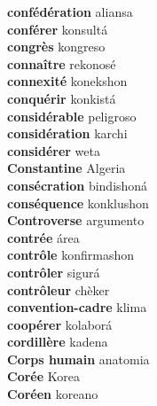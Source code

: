 \textbf{ confédération  } aliansa \\
\textbf{ conférer  } konsultá \\
\textbf{ congrès  } kongreso \\
\textbf{ connaître  } rekonosé \\
\textbf{ connexité  } konekshon \\
\textbf{ conquérir  } konkistá \\
\textbf{ considérable  } peligroso \\
\textbf{ considération  } karchi \\
\textbf{ considérer  } weta \\
\textbf{ Constantine  } Algeria \\
\textbf{ consécration  } bindishoná \\
\textbf{ conséquence  } konklushon \\
\textbf{ Controverse  } argumento \\
\textbf{ contrée  } área \\
\textbf{ contrôle  } konfirmashon \\
\textbf{ contrôler  } sigurá \\
\textbf{ contrôleur  } chèker \\
\textbf{ convention-cadre  } klima \\
\textbf{ coopérer  } kolaborá \\
\textbf{ cordillère  } kadena \\
\textbf{ Corps humain  } anatomia \\
\textbf{ Corée  } Korea \\
\textbf{ Coréen  } koreano \\
